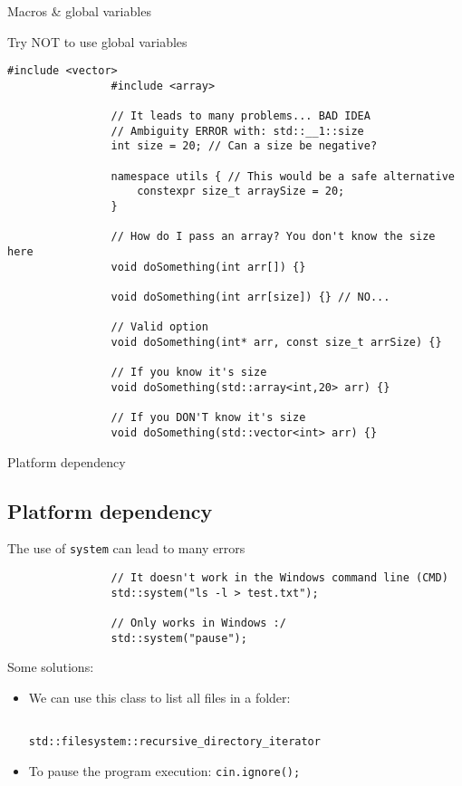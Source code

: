 \documentclass{beamer}
\newcommand{\normalSizeItem}[1] {
  \normalsize{\item #1}
}
\begin{document}
		\begin{frame}[fragile]{Macros \& global variables}	
			\begin{itemize}
			
				\normalSizeItem{Try NOT to use global variables}
				\begin{lstlisting}[basicstyle={\tiny\ttfamily}]
				#include <vector>
				#include <array>
				
				// It leads to many problems... BAD IDEA
				// Ambiguity ERROR with: std::__1::size
				int size = 20; // Can a size be negative?
				
				namespace utils { // This would be a safe alternative
					constexpr size_t arraySize = 20;
				}
				
				// How do I pass an array? You don't know the size here
				void doSomething(int arr[]) {}
				
				void doSomething(int arr[size]) {} // NO...
				
				// Valid option
				void doSomething(int* arr, const size_t arrSize) {}
				
				// If you know it's size
				void doSomething(std::array<int,20> arr) {}
				
				// If you DON'T know it's size
				void doSomething(std::vector<int> arr) {}
				\end{lstlisting}
				
			\end{itemize}
		\end{frame}
		
		\begin{frame}[fragile]{Platform dependency}	
			\subsection{Platform dependency}		
			\begin{itemize}

				\normalSizeItem { The use of \texttt{system} can lead to many errors}
				\begin{lstlisting}
				// It doesn't work in the Windows command line (CMD)
				std::system("ls -l > test.txt");
				
				// Only works in Windows :/
				std::system("pause"); 
				\end{lstlisting}
				
				\item { 
					
					Some solutions: 
								
					\begin{itemize}
						\item {
							We can use this class to list all files in a folder:
							 \begin{verbatim}
							 	std::filesystem::recursive_directory_iterator
							 \end{verbatim}
						}
						\item {
							To pause the program execution: \texttt{cin.ignore();}
						}
					\end{itemize}
				}
			\end{itemize}
		\end{frame}
		
\end{document}

